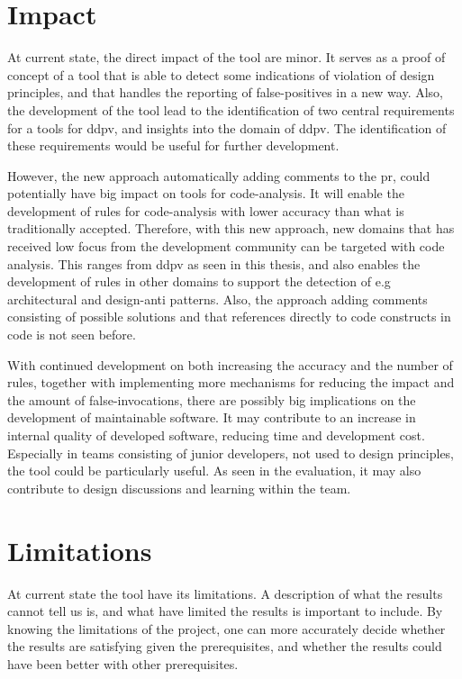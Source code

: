 \documentclass[pdftex,10pt,b5paper,twoside]{report}
\begin{document}
\section{Impact}

At current state, the direct impact of the tool are minor. It serves as a proof of concept of a tool that is able to detect some indications of violation of design principles, and that handles the reporting of false-positives in a new way. Also, the development of the tool lead to the identification of two central requirements for a tools for \gls{ddpv}, and insights into the domain of \gls{ddpv}. The identification of these requirements would be useful for further development.

However, the new approach automatically adding comments to the \gls{pr}, could potentially have big impact on tools for code-analysis. It will enable the development of rules for code-analysis with lower accuracy than what is traditionally accepted. Therefore, with this new approach, new domains that has received low focus from the development community can be targeted with code analysis. This ranges from \gls{ddpv} as seen in this thesis, and also enables the development of rules in other domains to support the detection of e.g architectural and design-anti patterns. Also, the approach adding comments consisting of possible solutions and that references directly to code constructs in code is not seen before.  

With continued development on both increasing the accuracy and the number of rules, together with implementing more mechanisms for reducing the impact and the amount of false-invocations, there are possibly big implications on the development of maintainable software. It may contribute to an increase in internal quality of developed software, reducing time and development cost. Especially in teams consisting of junior developers, not used to design principles, the tool could be particularly useful. As seen in the evaluation, it may also contribute to design discussions and learning within the team.


\section{Limitations}
At current state the tool have its limitations. A description of what the results cannot tell us is, and what have limited the results is important to include. By knowing the limitations of the project, one can more accurately decide whether the results are satisfying given the prerequisites, and whether the results could have been better with other prerequisites. 
\end{document}
